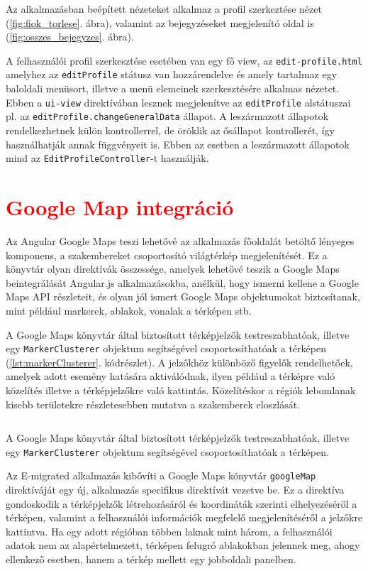 Az alkalmazásban beépített nézeteket alkalmaz a profil szerkeztése nézet (\ref{fig:fiok_torlese}. ábra), valamint az bejegyzéseket megjelenító oldal is (\ref{fig:osszes_bejegyzes}. ábra).

A felhasználói profil szerkesztése esetében van egy fő view, az \texttt{edit-profile.html} amelyhez az \texttt{editProfile} státusz van hozzárendelve és amely tartalmaz egy baloldali menüsort, illetve a menü elemeinek szerkesztésére alkalmas nézetet. Ebben a \texttt{ui-view} direktívában lesznek megjelenítve az \texttt{editProfile} alstátuszai pl. az \texttt{editProfile.changeGeneralData} állapot. A leszármazott állapotok rendelkezhetnek külön kontrollerrel, de öröklik az ősállapot kontrollerét, így használhatják annak függvényeit is. Ebben az esetben a leszármazott állapotok mind az \texttt{EditProfileController}-t használják. 

\section{\textcolor{red}{Google Map integráció}}
\label{sec:googleMap}
Az Angular Google Maps teszi lehetővé az alkalmazás főoldalát betöltő lényeges komponens, a szakembereket csoportosító világtérkép megjelenítését. Ez a könyvtár olyan direktívák összessége, amelyek lehetővé teszik a Google Maps beintegrálását Angular.js alkalmazásokba, anélkül, hogy ismerni kellene a Google Maps API részleteit, és olyan jól ismert Google Maps objektumokat biztosítanak, mint például markerek, ablakok, vonalak a térképen stb. \cite{AngularGoogleMap}

A Google Maps könyvtár által biztosított térképjelzők testreszabhatóak, illetve egy \texttt{MarkerClusterer} objektum segítségével csoportosíthatóak a térképen (\ref{lst:markerClusterer}. kódrészlet). A jelzőkhöz különböző figyelők rendelhetőek, amelyek adott esemény hatására aktiválódnak, ilyen például a térképre való közelítés illetve a térképjelzőkre való kattintás. Közelítéskor a régiók lebomlanak kisebb területekre részletesebben mutatva a szakemberek eloszlását. 
\begin{listing}
  \inputminted[fontsize=\small]{java}{progfiles/MarkerClusterer.js}
  \caption{A Google Maps könyvtár által biztosított térképjelzők testreszabhatóak, illetve egy \texttt{MarkerClusterer} objektum segítségével csoportosíthatóak a térképen.}
  \label{lst:markerClusterer}
\end{listing}

Az E-migrated alkalmazás kibővíti a Google Maps könyvtár \texttt{googleMap} direktíváját egy új, alkalmazás specifikus direktívát vezetve be. Ez a direktíva gondoskodik a térképjelzők létrehozásáról és koordináták szerinti elhelyezéséről a térképen, valamint a felhasználói információk megfelelő megjelenítéséről a jelzőkre kattintva. Ha egy adott régióban többen laknak mint három, a felhasználói adatok nem az alapértelmezett, térképen felugró ablakokban jelennek meg, ahogy ellenkező esetben, hanem a térkép mellett egy jobboldali panelben. 





 